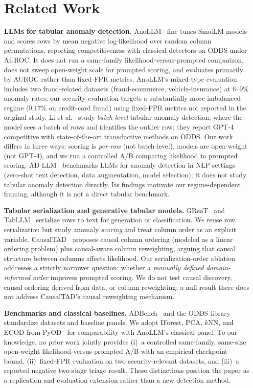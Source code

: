 \documentclass[conference]{IEEEtran}
\begin{document}
\section{Related Work}\label{sec:related}
\textbf{LLMs for tabular anomaly detection.}
AnoLLM~\cite{tsai2025anollm} fine-tunes SmolLM models and scores rows by mean negative log-likelihood over random column permutations, reporting competitiveness with classical detectors on ODDS under AUROC.
It does not run a same-family likelihood-versus-prompted comparison, does not sweep open-weight scale for prompted scoring, and evaluates primarily by AUROC rather than fixed-FPR metrics.
AnoLLM's mixed-type evaluation includes two fraud-related datasets (fraud-ecommerce, vehicle-insurance) at 6--9\% anomaly rates; our security evaluation targets a substantially more imbalanced regime (0.17\% on credit-card fraud) using fixed-FPR metrics not reported in the original study.
Li et al.~\cite{li2024tabularllm} study \emph{batch-level} tabular anomaly detection, where the model sees a batch of rows and identifies the outlier row; they report GPT-4 competitive with state-of-the-art transductive methods on ODDS. Our work differs in three ways: scoring is \emph{per-row} (not batch-level), models are open-weight (not GPT-4), and we run a controlled A/B comparing likelihood to prompted scoring.
AD-LLM~\cite{yang2025adllm} benchmarks LLMs for anomaly detection in NLP settings (zero-shot text detection, data augmentation, model selection); it does not study tabular anomaly detection directly. Its findings motivate our regime-dependent framing, although it is not a direct tabular benchmark.

\textbf{Tabular serialization and generative tabular models.}
GReaT~\cite{borisov2023great} and TabLLM~\cite{hegselmann2023tabllm} serialize rows to text for generation or classification.
We reuse row serialization but study anomaly \emph{scoring} and treat column order as an explicit variable. CausalTAD~\cite{causaltad2026} proposes causal column ordering (modeled as a linear ordering problem) plus causal-aware column reweighting, arguing that causal structure between columns affects likelihood. Our serialization-order ablation addresses a strictly narrower question: whether a \emph{manually defined domain-informed order} improves prompted scoring. We do not test causal discovery, causal ordering derived from data, or column reweighting; a null result there does not address CausalTAD's causal reweighting mechanism.

\textbf{Benchmarks and classical baselines.}
ADBench~\cite{han2022adbench} and the ODDS library standardize datasets and baseline panels.
We adopt IForest, PCA, $k$NN, and ECOD from PyOD~\cite{zhao2019pyod} for comparability with AnoLLM's classical panel.
To our knowledge, no prior work jointly provides (i)~a controlled same-family, same-size open-weight likelihood-versus-prompted A/B with an empirical checkpoint bound, (ii)~fixed-FPR evaluation on two security-relevant datasets, and (iii)~a reported negative two-stage triage result.
These distinctions position the paper as a replication and evaluation extension rather than a new detection method.
\end{document}
